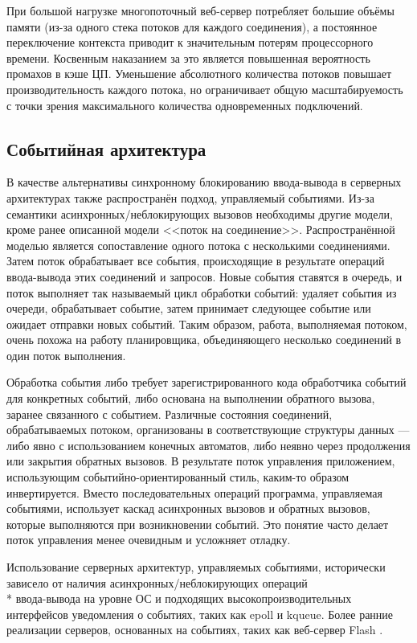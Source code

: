 При большой нагрузке многопоточный веб-сервер потребляет большие объёмы памяти (из-за одного стека потоков для каждого соединения), а постоянное переключение контекста приводит к значительным потерям процессорного времени. Косвенным наказанием за это является повышенная вероятность промахов в кэше ЦП. Уменьшение абсолютного количества потоков повышает производительность каждого потока, но ограничивает общую масштабируемость с точки зрения максимального количества одновременных подключений.

\subsection{Событийная архитектура}

В качестве альтернативы синхронному блокированию ввода-вывода в серверных архитектурах также распространён подход, управляемый событиями. Из-за семантики асинхронных/неблокирующих вызовов необходимы другие модели, кроме ранее описанной модели <<поток на соединение>>. Распространённой моделью является сопоставление одного потока с несколькими соединениями. Затем поток обрабатывает все события, происходящие в результате операций ввода-вывода этих соединений и запросов. Новые события ставятся в очередь, и поток выполняет так называемый цикл обработки событий: удаляет события из очереди, обрабатывает событие, затем принимает следующее событие или ожидает отправки новых событий. Таким образом, работа, выполняемая потоком, очень похожа на работу планировщика, объединяющего несколько соединений в один поток выполнения.

Обработка события либо требует зарегистрированного кода обработчика событий для конкретных событий, либо основана на выполнении обратного вызова, заранее связанного с событием. Различные состояния соединений, обрабатываемых потоком, организованы в соответствующие структуры данных — либо явно с использованием конечных автоматов, либо неявно через продолжения или закрытия обратных вызовов. В результате поток управления приложением, использующим событийно-ориентированный стиль, каким-то образом инвертируется. Вместо последовательных операций программа, управляемая событиями, использует каскад асинхронных вызовов и обратных вызовов, которые выполняются при возникновении событий. Это понятие часто делает поток управления менее очевидным и усложняет отладку.

Использование серверных архитектур, управляемых событиями, исторически зависело от наличия асинхронных/неблокирующих операций \\* ввода-вывода на уровне ОС и подходящих высокопроизводительных интерфейсов уведомления о событиях, таких как epoll и kqueue. Более ранние реализации серверов, основанных на событиях, таких как веб-сервер Flash \cite{vivek}.

